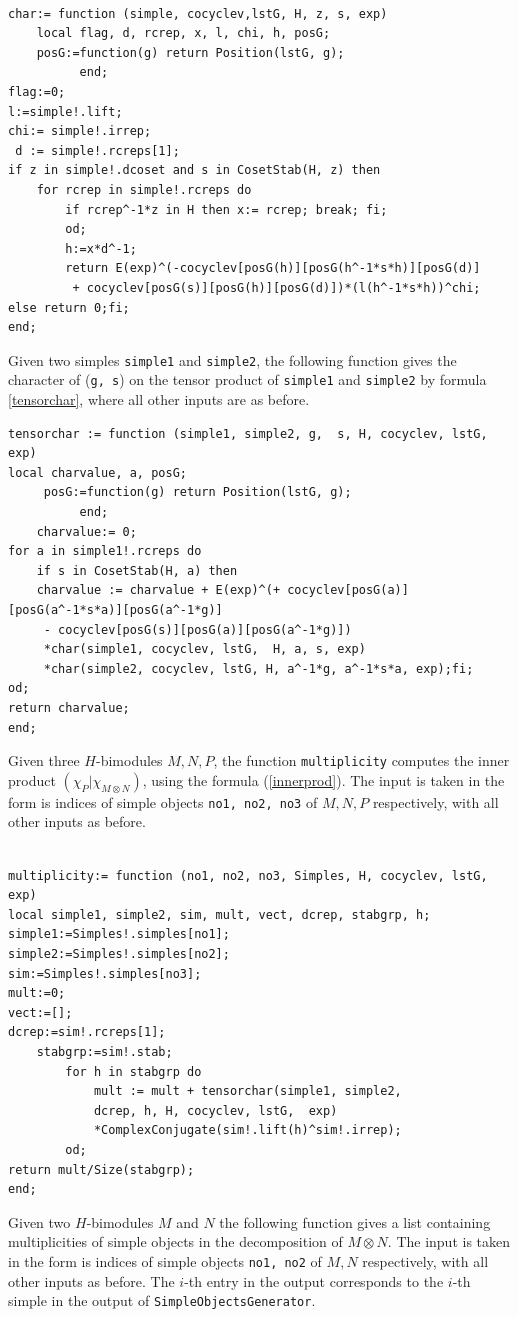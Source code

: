 \documentclass[a4paper, 10pt]{book}
\theoremstyle{definition}
\numberwithin{equation}{chapter}
\newcommand\lstl{\lstinline}
\begin{document}
\begin{lstlisting}

char:= function (simple, cocyclev,lstG, H, z, s, exp)
    local flag, d, rcrep, x, l, chi, h, posG;
    posG:=function(g) return Position(lstG, g);
          end;
flag:=0;
l:=simple!.lift;
chi:= simple!.irrep;
 d := simple!.rcreps[1];
if z in simple!.dcoset and s in CosetStab(H, z) then 
	for rcrep in simple!.rcreps do
		if rcrep^-1*z in H then x:= rcrep; break; fi;
		od;
		h:=x*d^-1;
		return E(exp)^(-cocyclev[posG(h)][posG(h^-1*s*h)][posG(d)]
		 + cocyclev[posG(s)][posG(h)][posG(d)])*(l(h^-1*s*h))^chi; 
else return 0;fi;
end;
\end{lstlisting}
Given two simples \lstl{simple1} and \lstl{simple2}, the following function gives the character of (\lstl{g, s}) on the tensor product of \lstl{simple1} and \lstl{simple2} by formula \eqref{tensorchar}, where all other inputs are as before.
\begin{lstlisting}
tensorchar := function (simple1, simple2, g,  s, H, cocyclev, lstG,  exp)
local charvalue, a, posG;
     posG:=function(g) return Position(lstG, g);
          end;
    charvalue:= 0;
for a in simple1!.rcreps do
	if s in CosetStab(H, a) then
	charvalue := charvalue + E(exp)^(+ cocyclev[posG(a)][posG(a^-1*s*a)][posG(a^-1*g)]
	 - cocyclev[posG(s)][posG(a)][posG(a^-1*g)])
	 *char(simple1, cocyclev, lstG,  H, a, s, exp)
	 *char(simple2, cocyclev, lstG, H, a^-1*g, a^-1*s*a, exp);fi;
od;
return charvalue;
end;
\end{lstlisting}
Given three $H$-bimodules $M, N, P$, the function \lstl{multiplicity} computes the inner product $(\chi_P| \chi_{M\otimes N})$, using the formula (\ref{innerprod}). The input is taken in the form is indices of simple objects \lstl{no1, no2, no3} of $M, N, P$ respectively, with all other inputs as before.
\begin{lstlisting}

multiplicity:= function (no1, no2, no3, Simples, H, cocyclev, lstG, exp)
local simple1, simple2, sim, mult, vect, dcrep, stabgrp, h;
simple1:=Simples!.simples[no1];
simple2:=Simples!.simples[no2];
sim:=Simples!.simples[no3];
mult:=0;
vect:=[];
dcrep:=sim!.rcreps[1];
	stabgrp:=sim!.stab;
		for h in stabgrp do
			mult := mult + tensorchar(simple1, simple2, 
			dcrep, h, H, cocyclev, lstG,  exp)
			*ComplexConjugate(sim!.lift(h)^sim!.irrep);
		od;
return mult/Size(stabgrp);
end;

\end{lstlisting}
Given two $H$-bimodules $M$ and $N$ the following function gives a list containing multiplicities of simple objects in the decomposition of $M\otimes N$. The input is taken in the form is indices of simple objects \lstl{no1, no2} of $M, N$ respectively, with all other inputs as before. The $i$-th entry in the output corresponds to the $i$-th simple in the output of \lstinline{SimpleObjectsGenerator}.
\end{document}
